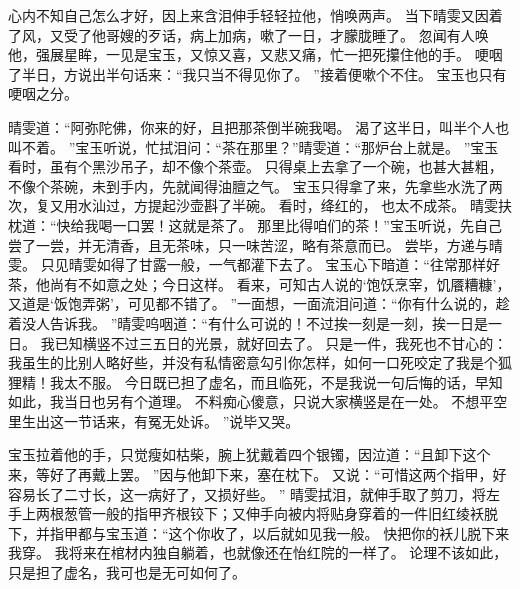 心内不知自己怎么才好，因上来含泪伸手轻轻拉他，悄唤两声。
当下晴雯又因着了风，又受了他哥嫂的歹话，病上加病，嗽了一日，才朦胧睡了。
忽闻有人唤他，强展星眸，一见是宝玉，又惊又喜，又悲又痛，忙一把死攥住他的手。
哽咽了半日，方说出半句话来：“我只当不得见你了。
”接着便嗽个不住。
宝玉也只有哽咽之分。
\par
晴雯道：“阿弥陀佛，你来的好，且把那茶倒半碗我喝。
渴了这半日，叫半个人也叫不着。
”宝玉听说，忙拭泪问：“茶在那里？”晴雯道：“那炉台上就是。
”宝玉看时，虽有个黑沙吊子，却不像个茶壶。
只得桌上去拿了一个碗，也甚大甚粗，不像个茶碗，未到手内，先就闻得油膻之气。
宝玉只得拿了来，先拿些水洗了两次，复又用水汕过，方提起沙壶斟了半碗。
看时，绛红的，
也太不成茶。
晴雯扶枕道：“快给我喝一口罢！这就是茶了。
那里比得咱们的茶！”宝玉听说，先自己尝了一尝，并无清香，且无茶味，只一味苦涩，略有茶意而已。
尝毕，方递与晴雯。
只见晴雯如得了甘露一般，一气都灌下去了。
宝玉心下暗道：“往常那样好茶，他尚有不如意之处；今日这样。
看来，可知古人说的‘饱饫烹宰，饥餍糟糠’，又道是‘饭饱弄粥’，可见都不错了。
”一面想，一面流泪问道：“你有什么说的，趁着没人告诉我。
”晴雯呜咽道：“有什么可说的！不过挨一刻是一刻，挨一日是一日。
我已知横竖不过三五日的光景，就好回去了。
只是一件，我死也不甘心的：我虽生的比别人略好些，并没有私情密意勾引你怎样，如何一口死咬定了我是个狐狸精！我太不服。
今日既已担了虚名，而且临死，不是我说一句后悔的话，早知如此，我当日也另有个道理。
不料痴心傻意，只说大家横竖是在一处。
不想平空里生出这一节话来，有冤无处诉。
”说毕又哭。
\par
宝玉拉着他的手，只觉瘦如枯柴，腕上犹戴着四个银镯，因泣道：“且卸下这个来，等好了再戴上罢。
”因与他卸下来，塞在枕下。
又说：“可惜这两个指甲，好容易长了二寸长，这一病好了，又损好些。
”
晴雯拭泪，就伸手取了剪刀，将左手上两根葱管一般的指甲齐根铰下；又伸手向被内将贴身穿着的一件旧红绫袄脱下，并指甲都与宝玉道：“这个你收了，以后就如见我一般。
快把你的袄儿脱下来我穿。
我将来在棺材内独自躺着，也就像还在怡红院的一样了。
论理不该如此，只是担了虚名，我可也是无可如何了。
